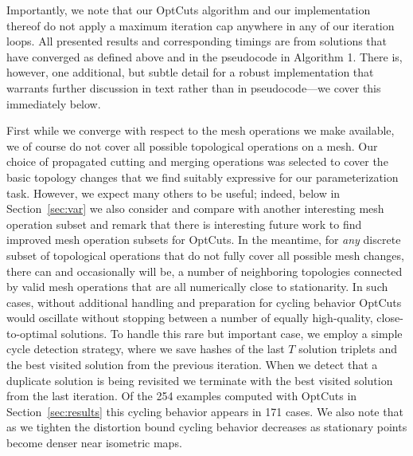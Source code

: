 Importantly, we note that our OptCuts algorithm and our implementation thereof do not apply a maximum iteration cap anywhere in any of our iteration loops. All presented results and corresponding timings are from solutions that have converged as defined above and in the pseudocode in Algorithm 1. There is, however, one additional, but subtle detail for a robust implementation that warrants further discussion in text rather than in pseudocode---we cover this immediately below.

First while we converge with respect to the mesh operations we make available, we of course do not cover all possible topological operations on a mesh. Our choice of propagated cutting and merging operations was selected to cover the basic topology changes that we find suitably expressive for our parameterization task. However, we expect many others to be useful; indeed, below in Section~\ref{sec:var} we also consider and compare with another interesting mesh operation subset and remark that there is interesting future work to find improved mesh operation subsets for OptCuts. In the meantime, for \emph{any} discrete subset of topological operations that do not fully cover all possible mesh changes, there can and occasionally will be, a number of neighboring topologies connected by valid mesh operations that are all numerically close to stationarity. In such cases, without additional handling and preparation for cycling behavior OptCuts would oscillate without stopping between a number of equally high-quality, close-to-optimal solutions. To handle this rare but important case, we employ a simple cycle detection strategy, where we save hashes of the last $T$ solution triplets and the best visited solution from the previous iteration. When we detect that a duplicate solution is being revisited we terminate with the best visited solution from the last iteration. Of the 254 examples computed with OptCuts in Section~\ref{sec:results} this cycling behavior appears in 171 cases. We also note that as we tighten the distortion bound cycling behavior decreases as stationary points become denser near isometric maps.

